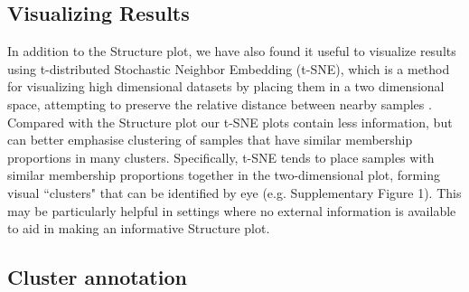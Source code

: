 \subsection{Visualizing Results}


In addition to the Structure plot, we have also found it useful to visualize results using t-distributed Stochastic Neighbor Embedding (t-SNE), which is a method for visualizing high dimensional datasets by placing them in a two dimensional space, attempting to preserve the relative distance between nearby samples \cite{Maaten2014,Maaten2008}. Compared with the Structure plot our t-SNE plots contain less information, but can better emphasise clustering of samples that have similar membership proportions in many clusters. Specifically, t-SNE tends to place samples with similar membership proportions together in the two-dimensional plot, forming visual ``clusters" that can be identified by eye (e.g. Supplementary Figure 1). This may be particularly helpful in settings where no external information is available to aid in making an informative Structure plot. 


\subsection{Cluster annotation}

